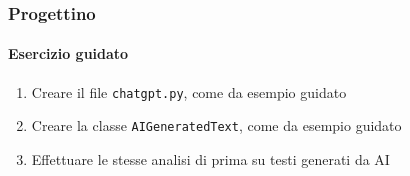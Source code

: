 \begin{exerciseframe}
    \frametitle{Progettino}
    \framesubtitle{Esercizio guidato}

    \begin{enumerate}
        \item Creare il file \texttt{chatgpt.py}, come da esempio guidato
        \item Creare la classe \texttt{AIGeneratedText}, come da esempio guidato
        \item Effettuare le stesse analisi di prima su testi generati da AI
    \end{enumerate}
\end{exerciseframe}

